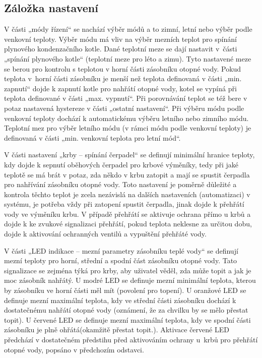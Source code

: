 \subsection{Záložka nastavení}
V části „módy řízení“ se nachází výběr módů a to zimní, letní nebo výběr podle venkovní teploty. Výběr módu má vliv na výběr mezních teplot pro spínání plynového kondenzačního kotle. Dané teplotní meze se dají nastavit v~části „spínání plynového kotle“ (teplotní meze pro léto a zimu). Tyto nastavené meze se berou pro kontrolu s teplotou v horní části zásobníku otopné vody. Pokud teplota v~horní části zásobníku je menší než teplota definovaná v části „min. zapnutí“ dojde k zapnutí kotle pro nahřátí otopné vody, kotel se vypíná při teplota definované v části „max. vypnutí“. Při porovnávání teplot se též bere v potaz nastavená hystereze v části „ostatní nastavení“. Při výběru módu podle venkovní teploty dochází k automatickému výběru letního nebo zimního módu. Teplotní mez pro výběr letního módu (v rámci módu podle venkovní teploty) je definovaná v části „min. venkovní teplota pro letní mód“. 

V části nastavení „krby – spínání čerpadel“ se definují minimální hranice teploty, kdy dojde k sepnutí oběhových čerpadel pro krbové výměníky, tedy při jaké teplotě se má brát v potaz, zda někdo v krbu zatopit a mají se spustit čerpadla pro nahřívání zásobníku otopné vody. Toto nastavení je poměrně důležité a kontrola těchto teplot je zcela nezávislá na dalších nastaveních (automatizaci) v systému, je potřeba vždy při zatopení spustit čerpadla, jinak dojde k přehřátí vody ve výměníku krbu. V případě přehřátí se aktivuje ochrana přímo u krbů a dojde k ke zvukové signalizaci přehřátí, pokud teplota neklesne za určitou dobu, dojde k aktivování ochranných ventilů a vypuštění přehřáté vody.

V části „LED indikace – mezní parametry zásobníku teplé vody“ se definují mezní teploty pro horní, střední a spodní část zásobníku otopné vody. Tato signalizace se zejména týká pro krby, aby uživatel věděl, zda může topit a jak je moc zásobník nahřátý. U modré LED se definuje mezní minimální teplota, kterou by zásobníku ve horní části měl mít (povolení pro topení). U oranžové LED se definuje mezní maximální teplota, kdy ve střední části zásobníku dochází k dostatečnému nahřátí otopné vody (oznámení, že za chvilku by se mělo přestat topit). U červené LED se definuje mezní maximální teplota, kdy ve spodní části zásobníku je plně ohřátá(okamžitě přestat topit.). Aktivace červené LED předchází v dostatečném předstihu před aktivováním ochrany u~krbů pro přehřátí otopné vody, popsáno v předchozím odstavci.

